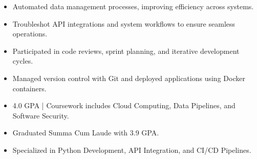 \par\smallskip
\noindent
\begin{minipage}{20cm}
  \begin{minipage}{9.75cm}
    \begin{itemize}
      \item Automated data management processes, improving efficiency across systems.
      \item Troubleshot API integrations and system workflows to ensure seamless operations.
    \end{itemize}
  \end{minipage}
  \hfill
  \begin{minipage}{9.75cm}
    \begin{itemize}
      \item Participated in code reviews, sprint planning, and iterative development cycles.
      \item Managed version control with Git and deployed applications using Docker containers.
    \end{itemize}
  \end{minipage}
\end{minipage}
\par\smallskip
\divider

\begin{itemize}
  \item 4.0 GPA | Coursework includes Cloud Computing, Data Pipelines, and Software Security.
\end{itemize}
\divider

\begin{itemize}
  \item Graduated Summa Cum Laude with 3.9 GPA.
  \item Specialized in Python Development, API Integration, and CI/CD Pipelines.
\end{itemize}

\noindent
\begin{minipage}{20cm}
\end{minipage}


